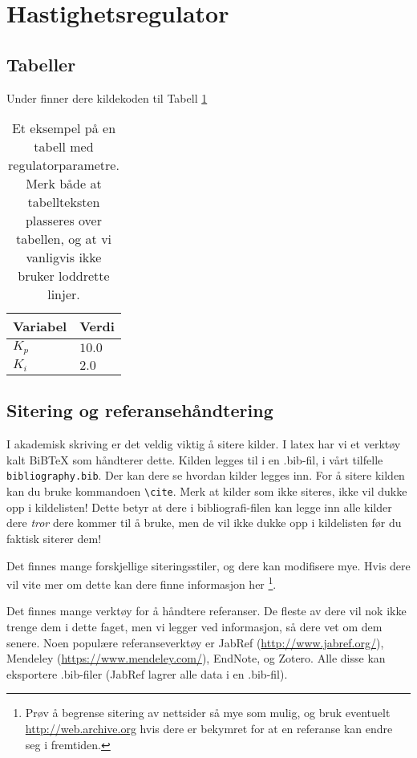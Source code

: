 \section{Hastighetsregulator}\label{sec:hastighetsreg}

\subsection{Tabeller}
Under finner dere kildekoden til Tabell \ref{tab:eksempeltabell}


\begin{table}[tb]
	\centering
	\begin{tabular}{ll} 
		\toprule
		Variabel & Verdi \\
		\midrule
        $K_p$ & $10.0$ \\
        $K_i$ & $2.0$\\
		\bottomrule
	\end{tabular}
    \caption{Et eksempel på en tabell med regulatorparametre. Merk både at tabellteksten plasseres over tabellen, og at vi vanligvis ikke bruker loddrette linjer.}
\label{tab:eksempeltabell}
\end{table}

\subsection{Sitering og referansehåndtering}
I akademisk skriving er det veldig viktig å sitere kilder. I latex har vi et verktøy kalt BiBTeX som 
håndterer dette. Kilden legges til i en .bib-fil, i vårt tilfelle \texttt{bibliography.bib}. Der kan dere
se hvordan kilder legges inn. For å sitere kilden kan du bruke kommandoen \texttt{\textbackslash{cite}}.
Merk at kilder som ikke siteres, ikke vil dukke opp i kildelisten! Dette betyr at dere i bibliografi-filen kan
legge inn alle kilder dere \emph{tror} dere kommer til å bruke, men de vil ikke dukke opp i kildelisten før du
faktisk siterer dem!

Det finnes mange forskjellige siteringsstiler, og dere kan modifisere mye. Hvis dere vil vite mer om dette
kan dere finne informasjon her \cite{BiberBibtexEtc,WikibookLatex}\footnote{Prøv å begrense sitering av 
nettsider så mye som mulig, og bruk eventuelt \url{http://web.archive.org} hvis dere er bekymret for at en 
referanse kan endre seg i fremtiden.}.

Det finnes mange verktøy for å håndtere referanser. 
De fleste av dere vil nok ikke trenge dem i dette faget, men vi legger ved informasjon, så dere vet om dem 
senere. Noen populære referanseverktøy er JabRef (\url{http://www.jabref.org/}), Mendeley (\url{https://www.mendeley.com/}), EndNote, og Zotero. Alle disse kan eksportere .bib-filer (JabRef lagrer alle
data i en .bib-fil).
